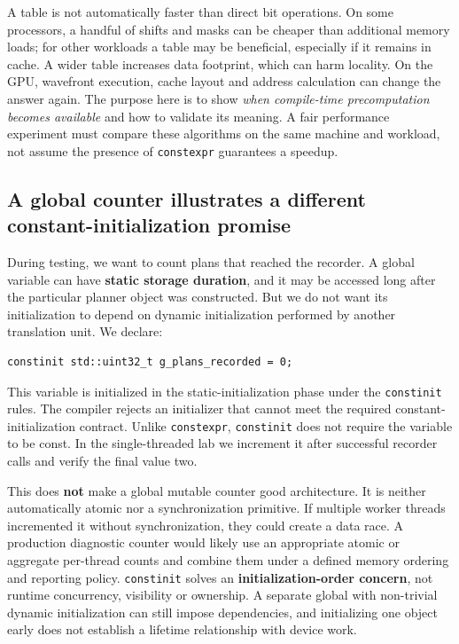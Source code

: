 A table is not automatically faster than direct bit operations. On some processors, a handful of shifts and masks can be cheaper than additional memory loads; for other workloads a table may be beneficial, especially if it remains in cache. A wider table increases data footprint, which can harm locality. On the GPU, wavefront execution, cache layout and address calculation can change the answer again. The purpose here is to show \emph{when compile-time precomputation becomes available} and how to validate its meaning. A fair performance experiment must compare these algorithms on the same machine and workload, not assume the presence of \texttt{constexpr} guarantees a speedup.

\subsection{A global counter illustrates a different constant-initialization promise}\label{05-engine-i-ch005-a-global-counter-illustrates-a-different-constant-initialization-promise}

During testing, we want to count plans that reached the recorder. A global variable can have \textbf{static storage duration}, and it may be accessed long after the particular planner object was constructed. But we do not want its initialization to depend on dynamic initialization performed by another translation unit. We declare:

\begin{verbatim}
constinit std::uint32_t g_plans_recorded = 0;
\end{verbatim}

This variable is initialized in the static-initialization phase under the \texttt{constinit} rules. The compiler rejects an initializer that cannot meet the required constant-initialization contract. Unlike \texttt{constexpr}, \texttt{constinit} does not require the variable to be const. In the single-threaded lab we increment it after successful recorder calls and verify the final value two.

This does \textbf{not} make a global mutable counter good architecture. It is neither automatically atomic nor a synchronization primitive. If multiple worker threads incremented it without synchronization, they could create a data race. A production diagnostic counter would likely use an appropriate atomic or aggregate per-thread counts and combine them under a defined memory ordering and reporting policy. \texttt{constinit} solves an \textbf{initialization-order concern}, not runtime concurrency, visibility or ownership. A separate global with non-trivial dynamic initialization can still impose dependencies, and initializing one object early does not establish a lifetime relationship with device work.

